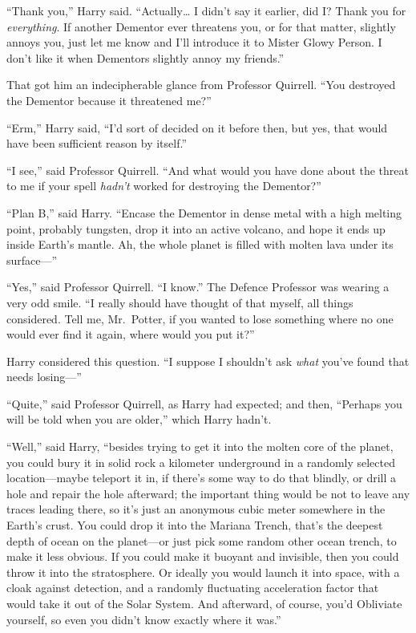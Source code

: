 ``Thank you,'' Harry said. ``Actually\ldots{} I didn't say it earlier,
did I? Thank you for \emph{everything}. If another Dementor ever
threatens you, or for that matter, slightly annoys you, just let me know
and I'll introduce it to Mister Glowy Person. I don't like it when
Dementors slightly annoy my friends.''

That got him an indecipherable glance from Professor Quirrell. ``You
destroyed the Dementor because it threatened me?''

``Erm,'' Harry said, ``I'd sort of decided on it before then, but yes,
that would have been sufficient reason by itself.''

``I see,'' said Professor Quirrell. ``And what would you have done about
the threat to me if your spell \emph{hadn't} worked for destroying the
Dementor?''

``Plan B,'' said Harry. ``Encase the Dementor in dense metal with a high
melting point, probably tungsten, drop it into an active volcano, and
hope it ends up inside Earth's mantle. Ah, the whole planet is filled
with molten lava under its surface---''

``Yes,'' said Professor Quirrell. ``I know.'' The Defence Professor was
wearing a very odd smile. ``I really should have thought of that myself,
all things considered. Tell me, Mr.~Potter, if you wanted to lose
something where no one would ever find it again, where would you put
it?''

Harry considered this question. ``I suppose I shouldn't ask \emph{what}
you've found that needs losing---''

``Quite,'' said Professor Quirrell, as Harry had expected; and then,
``Perhaps you will be told when you are older,'' which Harry hadn't.

``Well,'' said Harry, ``besides trying to get it into the molten core of
the planet, you could bury it in solid rock a kilometer underground in a
randomly selected location---maybe teleport it in, if there's some way
to do that blindly, or drill a hole and repair the hole afterward; the
important thing would be not to leave any traces leading there, so it's
just an anonymous cubic meter somewhere in the Earth's crust. You could
drop it into the Mariana Trench, that's the deepest depth of ocean on
the planet---or just pick some random other ocean trench, to make it
less obvious. If you could make it buoyant and invisible, then you could
throw it into the stratosphere. Or ideally you would launch it into
space, with a cloak against detection, and a randomly fluctuating
acceleration factor that would take it out of the Solar System. And
afterward, of course, you'd Obliviate yourself, so even you didn't know
exactly where it was.''

